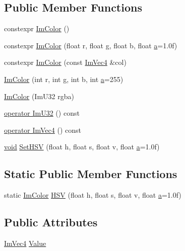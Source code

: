 \subsection*{Public Member Functions}
\begin{DoxyCompactItemize}
\item 
constexpr \hyperlink{structImColor_afcac85caf0653c8c73048b79f98a1933}{Im\+Color} ()
\item 
constexpr \hyperlink{structImColor_af43ef7c778b4eb6cd43285379026929b}{Im\+Color} (float r, float g, float b, float \hyperlink{pointer_8h_aeeddce917cf130d62c370b8f216026dd}{a}=1.\+0f)
\item 
constexpr \hyperlink{structImColor_ab013c0baa756972b6ad5c01b8f3159ab}{Im\+Color} (const \hyperlink{structImVec4}{Im\+Vec4} \&col)
\item 
\hyperlink{structImColor_ab4ba02f8290d5dadc1ebc57b2c8a9cbe}{Im\+Color} (int r, int g, int b, int \hyperlink{pointer_8h_aeeddce917cf130d62c370b8f216026dd}{a}=255)
\item 
\hyperlink{structImColor_ad306332841a2b1f903f40262a19f9412}{Im\+Color} (Im\+U32 rgba)
\item 
\hyperlink{structImColor_a4f4fc53e0676d50404d6d5ffcf16637f}{operator Im\+U32} () const
\item 
\hyperlink{structImColor_a10f1de242f13c93f8be64545e4cbcb0a}{operator Im\+Vec4} () const
\item 
\hyperlink{imgui__impl__opengl3__loader_8h_ac668e7cffd9e2e9cfee428b9b2f34fa7}{void} \hyperlink{structImColor_afcff20160db703b956d56e5a9fa88e24}{Set\+H\+SV} (float h, float s, float v, float \hyperlink{pointer_8h_aeeddce917cf130d62c370b8f216026dd}{a}=1.\+0f)
\end{DoxyCompactItemize}
\subsection*{Static Public Member Functions}
\begin{DoxyCompactItemize}
\item 
static \hyperlink{structImColor}{Im\+Color} \hyperlink{structImColor_ac8cb52119648523038818a613becf010}{H\+SV} (float h, float s, float v, float \hyperlink{pointer_8h_aeeddce917cf130d62c370b8f216026dd}{a}=1.\+0f)
\end{DoxyCompactItemize}
\subsection*{Public Attributes}
\begin{DoxyCompactItemize}
\item 
\hyperlink{structImVec4}{Im\+Vec4} \hyperlink{structImColor_a4cf43bd58e30decaa0248f839fc85e95}{Value}
\end{DoxyCompactItemize}


